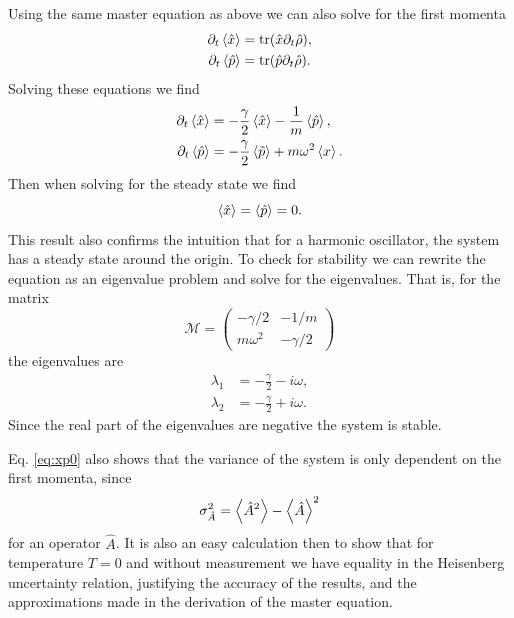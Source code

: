 Using the same master equation as above we can also solve for the first momenta
\begin{align}
    \partial_t\expval{\hat{x}} &= \tr(\hat{x} \partial_t \hat{\rho}),\\
    \partial_t\expval{\hat{p}} &= \tr(\hat{p} \partial_t \hat{\rho}).
\end{align}
Solving these equations we find 
\begin{align}
    \partial_t\expval{\hat{x}} &= -\frac{\gamma}{2} \expval{\hat{x}} - \frac{1}{m} \expval{\hat{p}},\\
    \partial_t\expval{\hat{p}} &= -\frac{\gamma}{2} \expval{\hat{p}} + m\omega^2 \expval{x}.
\end{align}
Then when solving for the steady state we find 
\begin{equation}
    \expval{\hat{x}} = \expval{\hat{p}} = 0. \label{eq:xp0}
\end{equation}
This result also confirms the intuition that for a harmonic oscillator, the system has a steady state around the origin. To check for stability we can rewrite the equation as an eigenvalue problem and solve for the eigenvalues. That is, for the matrix
\begin{equation}
    \mathcal{M} = \begin{pmatrix}
        -\gamma/2 & -1/m \\
        m\omega^2 & -\gamma/2
    \end{pmatrix}
\end{equation}
the eigenvalues are 
\begin{align}
    \lambda_1 &= -\frac{\gamma}{2} - i\omega,\\
    \lambda_2 &= -\frac{\gamma}{2} + i\omega.
\end{align}
Since the real part of the eigenvalues are negative the system is stable.

Eq. \eqref{eq:xp0} also shows that the variance of the system is only dependent on the first momenta, since
\begin{equation}
    \sigma^2_{\hat{A}} = \expval{\hat{A}^2} - \expval{\hat{A}}^2
\end{equation}
for an operator $\hat{A}$. It is also an easy calculation then to show that for temperature $T=0$ and without measurement we have equality in the Heisenberg uncertainty relation, justifying the accuracy of the results, and the approximations made in the derivation of the master equation.

